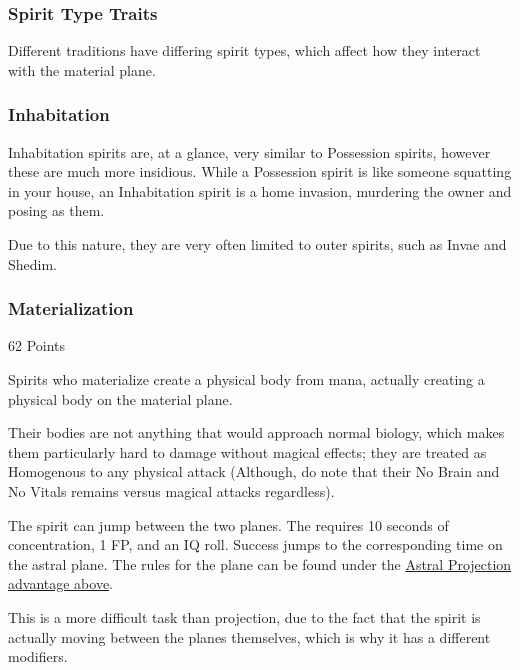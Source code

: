 \begin{multicols}{3}
	
	\subsubsection{Spirit Type Traits}
	
	Different traditions have differing spirit types, which affect how they interact with the material plane.
	
	\subsubsection*{Inhabitation}
	
	Inhabitation spirits are, at a glance, very similar to Possession spirits, however these are much more insidious. While a Possession spirit is like someone squatting in your house, an Inhabitation spirit is a home invasion, murdering the owner and posing as them.
	
	Due to this nature, they are very often limited to outer spirits, such as Invae and Shedim.
	
	
	\subsubsection*{Materialization}\label{materialization}
	\begin{flushright}
		62 Points
	\end{flushright}
	
	Spirits who materialize create a physical body from mana, actually creating a physical body on the material plane. 
	
	Their bodies are not anything that would approach normal biology, which makes them particularly hard to damage without magical effects; they are treated as Homogenous to any physical attack (Although, do note that their No Brain and No Vitals remains versus magical attacks regardless).
	
	The spirit can jump between the two planes. The requires 10 seconds of concentration, 1 FP, and an IQ roll. Success jumps to the corresponding time on the astral plane. The rules for the plane can be found under the \hyperref[astral_projection]{Astral Projection advantage above}. 
	
	This is a more difficult task than projection, due to the fact that the spirit is actually moving between the planes themselves, which is why it has a different modifiers. 
	

\end{multicols}
